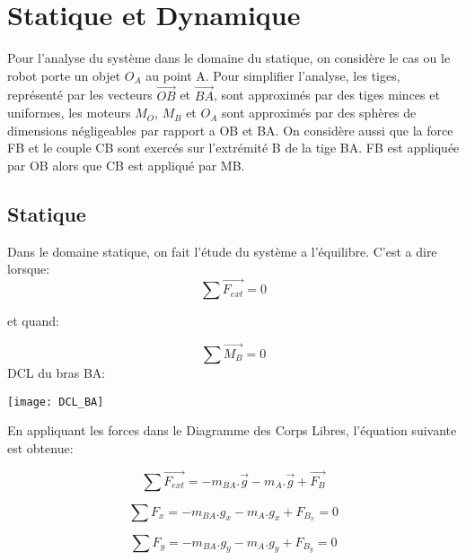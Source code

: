 \documentclass{article}
\begin{document}
\section{Statique et Dynamique}
\noindent
Pour l'analyse du système dans le domaine du statique, on considère le cas ou le robot porte un objet $O_A$ au point A. Pour simplifier l'analyse, les tiges, représenté par les vecteurs $\overrightarrow{OB}$ et $\overrightarrow{BA}$, sont approximés par des tiges minces et uniformes, les moteurs $M_O$, $M_B$ et $O_A$ sont approximés par des sphères de dimensions négligeables par rapport a OB et BA. On considère aussi que la force FB et le couple CB sont exercés sur l’extrémité B de la tige BA. FB est appliquée par OB alors que CB est appliqué par MB.

\subsection{Statique}
\noindent
Dans le domaine statique, on fait l'étude du système a l'équilibre. C'est a dire lorsque: 
\begin{equation}
\sum \overrightarrow{F_{ext}} = 0
\end{equation}

\begin{center} 
et quand:
\end{center}

\begin{equation}
\sum \overrightarrow{M_B} = 0
\end{equation}
\newline
\newline
DCL du bras BA:
\newline
\begin{center}
\noindent \texttt{[image: DCL\_BA]}
\end{center}

\noindent En appliquant les forces dans le Diagramme des Corps Libres, l'équation suivante est obtenue:

\begin{equation}
\sum \overrightarrow{F_{ext}} = -m_{BA}.\overrightarrow{g} -m_A.\overrightarrow{g} + \overrightarrow{F_B}
\end{equation}

\begin{equation}
\sum F_x = -m_{BA}.g_x -m_A.g_x + F_{B_x} = 0
\end{equation}

\begin{equation}
\sum F_y = -m_{BA}.g_y -m_A.g_y + F_{B_y} = 0
\end{equation}
\end{document}
